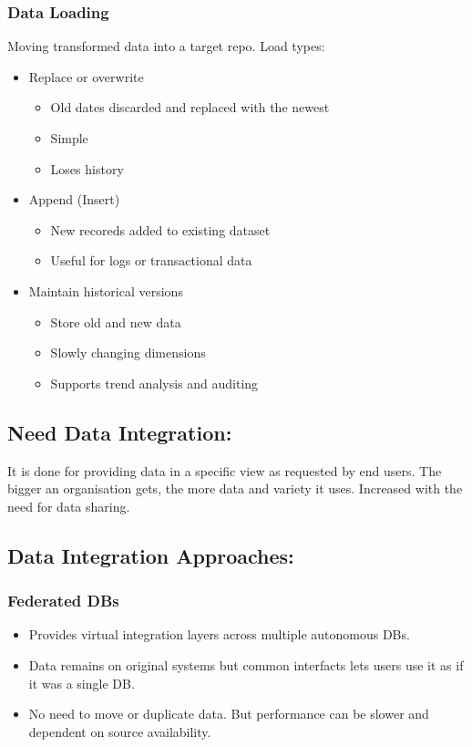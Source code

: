\documentclass[a5paper]{article}
\begin{document}
	\subsubsection{Data Loading}
	Moving transformed data into a target repo. Load types:
	\begin{itemize}
		\item Replace or overwrite
			\begin{itemize}
				\item Old dates discarded and replaced with the newest
				\item Simple
				\item Loses history
			\end{itemize}
		\item Append (Insert)
			\begin{itemize}
				\item New recoreds added to existing dataset
				\item Useful for logs or transactional data
			\end{itemize}
		\item Maintain historical versions
			\begin{itemize}
				\item Store old and new data
				\item Slowly changing dimensions
				\item Supports trend analysis and auditing
			\end{itemize}
	\end{itemize}
	\subsection{Need Data Integration:}
	It is done for providing data in a specific view as requested by end users. The bigger an organisation gets, the more data and variety it uses. Increased with the need for data sharing.
	\subsection{Data Integration Approaches:}
	\subsubsection{Federated DBs}
	\begin{itemize}
		\item Provides virtual integration layers across multiple autonomous DBs.
		\item Data remains on original systems but common interfacts lets users use it as if it was a single DB.
		\item No need to move or duplicate data. But performance can be slower and dependent on source availability.
	\end{itemize}
\end{document}

